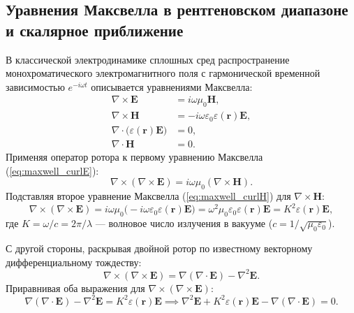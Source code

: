 \documentclass[a4paper,11pt]{article}
\begin{document}
\subsection{Уравнения Максвелла в рентгеновском диапазоне и скалярное приближение}

В классической электродинамике сплошных сред распространение монохроматического электромагнитного поля с гармонической временной зависимостью $e^{-i\omega t}$ описывается уравнениями Максвелла:
\begin{align}
    \nabla \times \mathbf{E} &= i \omega \mu_0 \mathbf{H}, \label{eq:maxwell_curlE} \\
    \nabla \times \mathbf{H} &= -i \omega \varepsilon_0 \varepsilon(\mathbf{r}) \mathbf{E}, \label{eq:maxwell_curlH} \\
    \nabla \cdot \big(\varepsilon(\mathbf{r}) \mathbf{E}\big) &= 0, \label{eq:maxwell_divE} \\
    \nabla \cdot \mathbf{H} &= 0. \label{eq:maxwell_divH}
\end{align}
Применяя оператор ротора к первому уравнению Максвелла (\ref{eq:maxwell_curlE}):
\begin{equation}
    \nabla \times (\nabla \times \mathbf{E}) = i \omega \mu_0 (\nabla \times \mathbf{H}).
\end{equation}
Подставляя второе уравнение Максвелла (\ref{eq:maxwell_curlH}) для $\nabla \times \mathbf{H}$:
\begin{equation}
    \nabla \times (\nabla \times \mathbf{E}) = i \omega \mu_0 \big(-i \omega \varepsilon_0 \varepsilon(\mathbf{r}) \mathbf{E}\big) = \omega^2 \mu_0 \varepsilon_0 \varepsilon(\mathbf{r}) \mathbf{E} = K^2 \varepsilon(\mathbf{r}) \mathbf{E},
\end{equation}
где $K = \omega / c = 2\pi / \lambda$ — волновое число излучения в вакууме ($c = 1/\sqrt{\mu_0 \varepsilon_0}$).

С другой стороны, раскрывая двойной ротор по известному векторному дифференциальному тождеству:
\begin{equation}
    \nabla \times (\nabla \times \mathbf{E}) = \nabla (\nabla \cdot \mathbf{E}) - \nabla^2 \mathbf{E}.
\end{equation}
Приравнивая оба выражения для $\nabla \times (\nabla \times \mathbf{E})$:
\begin{equation}
    \nabla (\nabla \cdot \mathbf{E}) - \nabla^2 \mathbf{E} = K^2 \varepsilon(\mathbf{r}) \mathbf{E} \implies \nabla^2 \mathbf{E} + K^2 \varepsilon(\mathbf{r}) \mathbf{E} - \nabla (\nabla \cdot \mathbf{E}) = 0.
    \label{eq:wave_intermediate}
\end{equation}
\end{document}
